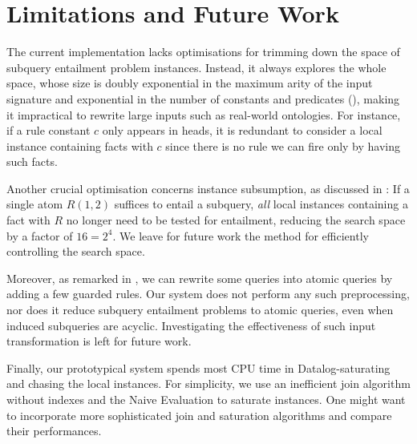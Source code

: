 \documentclass[12pt]{report}
\theoremstyle{plain}
\theoremstyle{definition}
\begin{document}
\section{Limitations and Future Work}
\label{section:limitations-and-future-work}


The current implementation lacks optimisations for trimming down the space of subquery entailment problem instances. Instead, it always explores the whole space, whose size is doubly exponential in the maximum arity of the input signature and exponential in the number of constants and predicates (), making it impractical to rewrite large inputs such as real-world ontologies. For instance, if a rule constant $c$ only appears in heads, it is redundant to consider a local instance containing facts with $c$ since there is no rule we can fire only by having such facts.

Another crucial optimisation concerns instance subsumption, as discussed in : If a single atom $R(1, 2)$ suffices to entail a subquery, \emph{all} local instances containing a fact with $R$ no longer need to be tested for entailment, reducing the search space by a factor of $16 = 2^4$. We leave for future work the method for efficiently controlling the search space.

Moreover, as remarked in , we can rewrite some queries into atomic queries by adding a few guarded rules. Our system does not perform any such preprocessing, nor does it reduce subquery entailment problems to atomic queries, even when induced subqueries are acyclic. Investigating the effectiveness of such input transformation is left for future work.

Finally, our prototypical system spends most CPU time in Datalog-saturating and chasing the local instances. For simplicity, we use an inefficient join algorithm without indexes and the Naive Evaluation to saturate instances. One might want to incorporate more sophisticated join and saturation algorithms and compare their performances.

\printbibliography
\end{document}
